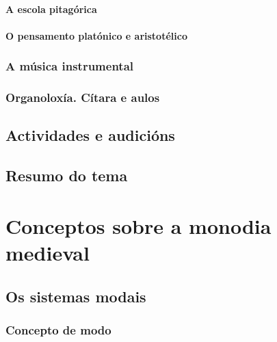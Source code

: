 \documentclass[a4paper, twoside]{templates/ociamthesis}
\begin{document}
\hypertarget{a-escola-pitaguxf3rica}{%
\subsubsection{A escola pitagórica}\label{a-escola-pitaguxf3rica}}

\hypertarget{o-pensamento-platuxf3nico-e-aristotuxe9lico}{%
\subsubsection{O pensamento platónico e aristotélico}\label{o-pensamento-platuxf3nico-e-aristotuxe9lico}}

\hypertarget{a-muxfasica-instrumental}{%
\subsection{A música instrumental}\label{a-muxfasica-instrumental}}

\hypertarget{organoloxuxeda.-cuxedtara-e-aulos}{%
\subsection{Organoloxía. Cítara e aulos}\label{organoloxuxeda.-cuxedtara-e-aulos}}

\hypertarget{actividades-e-audiciuxf3ns-1}{%
\section{Actividades e audicións}\label{actividades-e-audiciuxf3ns-1}}

\hypertarget{resumo-do-tema}{%
\section{Resumo do tema}\label{resumo-do-tema}}

\hypertarget{conceptos-sobre-a-monodia-medieval}{%
\chapter{Conceptos sobre a monodia medieval}\label{conceptos-sobre-a-monodia-medieval}}

\minitoc 

\hypertarget{os-sistemas-modais}{%
\section{Os sistemas modais}\label{os-sistemas-modais}}

\hypertarget{concepto-de-modo}{%
\subsection{Concepto de modo}\label{concepto-de-modo}}
\end{document}

